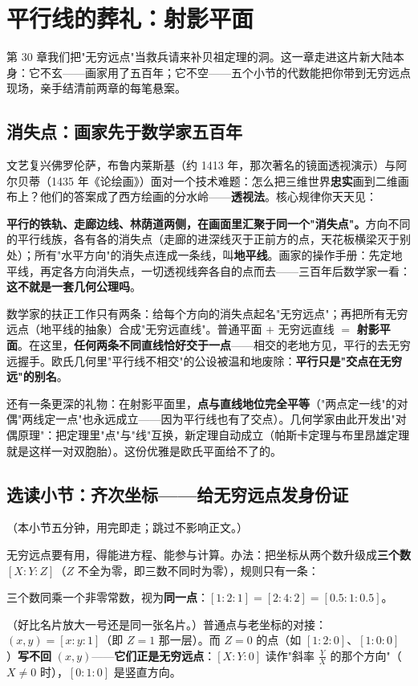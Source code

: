\chapter{平行线的葬礼：射影平面}

第 30 章我们把"无穷远点"当救兵请来补贝祖定理的洞。这一章走进这片新大陆本身：它不玄——画家用了五百年；它不空——五个小节的代数能把你带到无穷远点现场，亲手结清前两章的每笔悬案。

\section{消失点：画家先于数学家五百年}

文艺复兴佛罗伦萨，布鲁内莱斯基（约 1413 年，那次著名的镜面透视演示）与阿尔贝蒂（1435 年《论绘画》）面对一个技术难题：怎么把三维世界\textbf{忠实}画到二维画布上？他们的答案成了西方绘画的分水岭——\textbf{透视法}。核心规律你天天见：

\textbf{平行的铁轨、走廊边线、林荫道两侧，在画面里汇聚于同一个"消失点"。}方向不同的平行线族，各有各的消失点（走廊的进深线灭于正前方的点，天花板横梁灭于别处）；所有"水平方向"的消失点连成一条线，叫\textbf{地平线}。画家的操作手册：先定地平线，再定各方向消失点，一切透视线奔各自的点而去——三百年后数学家一看：\textbf{这不就是一套几何公理吗}。

数学家的扶正工作只有两条：给每个方向的消失点起名"无穷远点"；再把所有无穷远点（地平线的抽象）合成"无穷远直线"。普通平面 $+$ 无穷远直线 $=$ \textbf{射影平面}。在这里，\textbf{任何两条不同直线恰好交于一点}——相交的老地方见，平行的去无穷远握手。欧氏几何里"平行线不相交"的公设被温和地废除：\textbf{平行只是"交点在无穷远"的别名}。

还有一条更深的礼物：在射影平面里，\textbf{点与直线地位完全平等}（"两点定一线"的对偶"两线定一点"也永远成立——因为平行线也有了交点）。几何学家由此开发出"对偶原理"：把定理里"点"与"线"互换，新定理自动成立（帕斯卡定理与布里昂雄定理就是这样一对双胞胎）。这份优雅是欧氏平面给不了的。

\section{选读小节：齐次坐标——给无穷远点发身份证}

（本小节五分钟，用完即走；跳过不影响正文。）

无穷远点要有用，得能进方程、能参与计算。办法：把坐标从两个数升级成\textbf{三个数} $[X : Y : Z]$（$Z$ 不全为零，即三数不同时为零），规则只有一条：
\begin{jielun}
三个数同乘一个非零常数，视为\textbf{同一点}：$[1:2:1] = [2:4:2] = [0.5:1:0.5]$。
\end{jielun}
（好比名片放大一号还是同一张名片。）普通点与老坐标的对接：$(x, y) = [x : y : 1]$（即 $Z = 1$ 那一层）。而 $Z = 0$ 的点（如 $[1:2:0]$、$[1:0:0]$）\textbf{写不回} $(x,y)$——\textbf{它们正是无穷远点}：$[X:Y:0]$ 读作"斜率 $\tfrac YX$ 的那个方向"（$X \ne 0$ 时），$[0:1:0]$ 是竖直方向。

